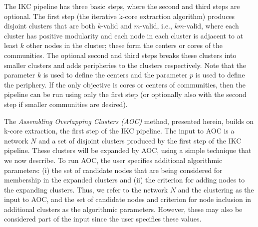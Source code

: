 \documentclass[12pt, oneside]{article}   	%
\begin{document}
The IKC pipeline has three basic steps, where the second and third steps are optional.  The first step (the iterative k-core extraction algorithm) produces disjoint clusters that are both $k$-valid and $m$-valid, i.e.,  $km$-valid, where each cluster has positive modularity and each node in each cluster is adjacent to at least $k$ other nodes in the cluster; these form the centers or cores of the communities. The optional second and third steps breaks these clusters into smaller clusters and adds peripheries to the clusters respectively.  Note that the parameter $k$ is used to define the centers and the parameter $p$ is used to define the periphery. If the only objective is cores or centers of communities, then the pipeline can be run using only the first step (or optionally also with the second step if smaller communities are desired).

	
The \emph{Assembling Overlapping Clusters (AOC)} method, presented herein, builds on k-core extraction, the first step of the IKC pipeline. The input to AOC is a network $N$ and a set of disjoint clusters produced by the first step of the IKC pipeline. These clusters will be expanded by AOC,  using a simple technique that we now describe. To run AOC, the user specifies additional algorithmic parameters:  (i) the set of candidate nodes that are being considered for membership in the expanded clusters and  (ii) the criterion for adding nodes to the expanding clusters. 
Thus, we refer to the network $N$ and the clustering as the input to AOC, and the set of candidate nodes and criterion for node inclusion in additional clusters as the algorithmic parameters. However, these may also be considered part of the input since the user specifies these values.
\end{document}
